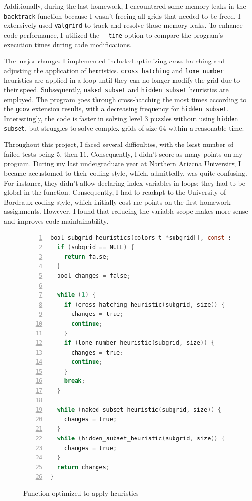 \documentclass[a4paper, 11pt]{article}
\begin{document}
\par Additionally, during the last homework, I encountered some memory leaks in the \texttt{backtrack} function because I wasn't freeing all grids that needed to be freed. I extensively used \texttt{valgrind} to track and resolve these memory leaks. To enhance code performance, I utilized the \texttt{- time} option to compare the program's execution times during code modifications.

\par The major changes I implemented included optimizing cross-hatching and adjusting the application of heuristics. \texttt{cross hatching} and \texttt{lone number} heuristics are applied in a loop until they can no longer modify the grid due to their speed. Subsequently, \texttt{naked subset} and \texttt{hidden subset} heuristics are employed. The program goes through cross-hatching the most times according to the \texttt{gcov} extension results, with a decreasing frequency for \texttt{hidden subset}. Interestingly, the code is faster in solving level 3 puzzles without using \texttt{hidden subset}, but struggles to solve complex grids of size 64 within a reasonable time.

\par Throughout this project, I faced several difficulties, with the least number of failed tests being \(5\), then \(11\). Consequently, I didn't score as many points on my program. During my last undergraduate year at Northern Arizona University, I became accustomed to their coding style, which, admittedly, was quite confusing. For instance, they didn't allow declaring index variables in loops; they had to be global in the function. Consequently, I had to readapt to the University of Bordeaux coding style, which initially cost me points on the first homework assignments. However, I found that reducing the variable scope makes more sense and improves code maintainability.

\begin{figure}[h]
  \centering
  \begin{lstlisting}[language=C, frame = single, numbers = left]
bool subgrid_heuristics(colors_t *subgrid[], const size_t size) {
  if (subgrid == NULL) {
    return false;
  }
  bool changes = false;

  while (1) {
    if (cross_hatching_heuristic(subgrid, size)) {
      changes = true;
      continue;
    }
    if (lone_number_heuristic(subgrid, size)) {
      changes = true;
      continue;
    }
    break;
  }

  while (naked_subset_heuristic(subgrid, size)) {
    changes = true;
  }
  while (hidden_subset_heuristic(subgrid, size)) {
    changes = true;
  }
  return changes;
}
  \end{lstlisting}
  \caption{Function optimized to apply heuristics}
  \end{figure} 
  
\end{document}
